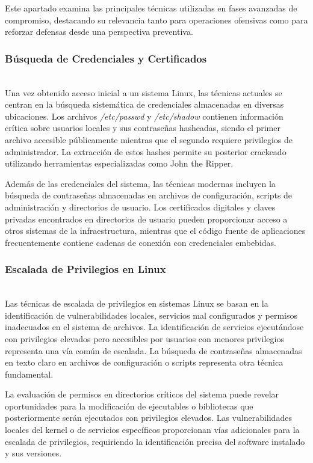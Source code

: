 \documentclass[runningheads]{llncs}
\begin{document}
Este apartado examina las principales técnicas utilizadas en fases avanzadas de compromiso, destacando su relevancia tanto para operaciones ofensivas como para reforzar defensas desde una perspectiva preventiva.

\subsubsection{Búsqueda de Credenciales y Certificados}
\hfill\\

Una vez obtenido acceso inicial a un sistema Linux, las técnicas actuales se centran en la búsqueda sistemática de credenciales almacenadas en diversas ubicaciones. Los archivos \textit{/etc/passwd} y \textit{/etc/shadow} contienen información crítica sobre usuarios locales y sus contraseñas hasheadas, siendo el primer archivo accesible públicamente mientras que el segundo requiere privilegios de administrador. La extracción de estos hashes permite su posterior crackeado utilizando herramientas especializadas como John the Ripper.

Además de las credenciales del sistema, las técnicas modernas incluyen la búsqueda de contraseñas almacenadas en archivos de configuración, scripts de administración y directorios de usuario. Los certificados digitales y claves privadas encontrados en directorios de usuario pueden proporcionar acceso a otros sistemas de la infraestructura, mientras que el código fuente de aplicaciones frecuentemente contiene cadenas de conexión con credenciales embebidas.
\subsubsection{Escalada de Privilegios en Linux}
\hfill\\

Las técnicas de escalada de privilegios en sistemas Linux se basan en la identificación de vulnerabilidades locales, servicios mal configurados y permisos inadecuados en el sistema de archivos. La identificación de servicios ejecutándose con privilegios elevados pero accesibles por usuarios con menores privilegios representa una vía común de escalada. La búsqueda de contraseñas almacenadas en texto claro en archivos de configuración o scripts representa otra técnica fundamental.

La evaluación de permisos en directorios críticos del sistema puede revelar oportunidades para la modificación de ejecutables o bibliotecas que posteriormente serán ejecutados con privilegios elevados. Las vulnerabilidades locales del kernel o de servicios específicos proporcionan vías adicionales para la escalada de privilegios, requiriendo la identificación precisa del software instalado y sus versiones.
\end{document}
